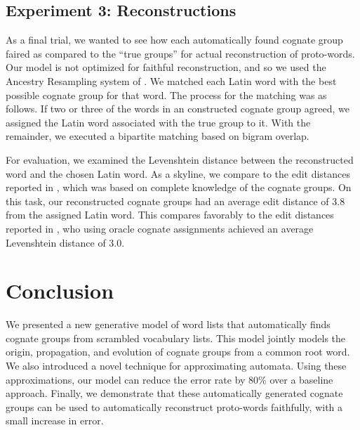 \documentclass[11pt,a4paper]{article}
\begin{document}
\subsection{Experiment 3: Reconstructions}

As a final trial, we wanted to see how each automatically found
cognate group faired as compared to the ``true groups'' for actual
reconstruction of proto-words. Our model is not optimized for
faithful reconstruction, and so we used the Ancestry Resampling
system of . We matched each Latin word
with the best possible cognate group for that word. The process for
the matching was as follows. If two or three of the words in an
constructed cognate group agreed, we assigned the Latin word
associated with the true group to it. With the remainder, we executed
a bipartite matching based on bigram overlap.

For evaluation, we examined the Levenshtein distance between the
reconstructed word and the chosen Latin word. As a skyline, we
compare to the edit distances reported in ,
which was based on complete knowledge of the cognate groups. On
this task, our reconstructed cognate groups had an average edit
distance of 3.8 from the assigned Latin word. This compares favorably to the
edit distances reported in , who using oracle
cognate assignments achieved an average Levenshtein distance of 3.0.

\section{Conclusion}

We presented a new generative model of word lists that automatically
finds cognate groups from scrambled vocabulary lists. This model
jointly models the origin, propagation, and evolution of cognate
groups from a common root word. We also introduced a novel technique
for approximating automata. Using these approximations, our model
can reduce the error rate by 80\% over a baseline approach. Finally,
we demonstrate that these automatically generated cognate groups
can be used to automatically reconstruct proto-words faithfully,
with a small increase in error.



\end{document}
